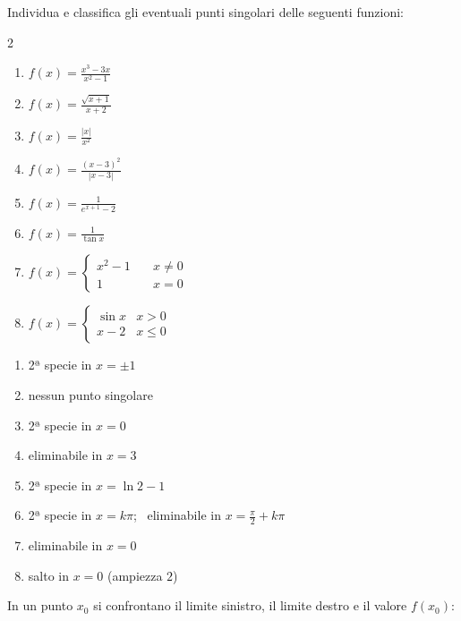 \begin{question}[ID=2.4, subtitle={Punti singolari — serie 4}, tags={continuità, punti singolari}, difficulty=media]
Individua e classifica gli eventuali punti singolari delle seguenti funzioni:
\begin{center}\begin{minipage}{0.92\linewidth}
\begin{multicols}{2}
\begin{enumerate}[label=\arabic*),leftmargin=3.2cm]
\item $f(x) = \frac{x^3 - 3x}{x^2 - 1}$
\item $f(x) = \frac{\sqrt{x+1}}{x+2}$
\item $f(x) = \frac{|x|}{x^2}$
\item $f(x) = \frac{(x-3)^2}{|x-3|}$
\item $f(x) = \frac{1}{e^{x+1} - 2}$
\item $f(x) = \frac{1}{\tan x}$
\item $f(x) = \begin{cases} x^2 - 1 \quad & x \neq 0 \\ 1 \quad & x = 0 \end{cases}$
\item $f(x) = \begin{cases} \sin x & x > 0 \\ x - 2 & x \le 0 \end{cases}$
\end{enumerate}
\end{multicols}
\end{minipage}\end{center}
\begin{solution}
\begin{enumerate}[label=\arabic*)]
    \item 2ª specie in $x=\pm1$
    \item nessun punto singolare
    \item 2ª specie in $x=0$
    \item eliminabile in $x=3$
    \item 2ª specie in $x=\ln2-1$
    \item 2ª specie in $x=k\pi$; \ eliminabile in $x=\tfrac\pi2+k\pi$
    \item eliminabile in $x=0$
    \item salto in $x=0$ (ampiezza $2$)
\end{enumerate}
\end{solution}
\begin{explanation}
In un punto $x_0$ si confrontano il limite sinistro, il limite destro e il valore $f(x_0)$:

\end{explanation}
\end{question}
